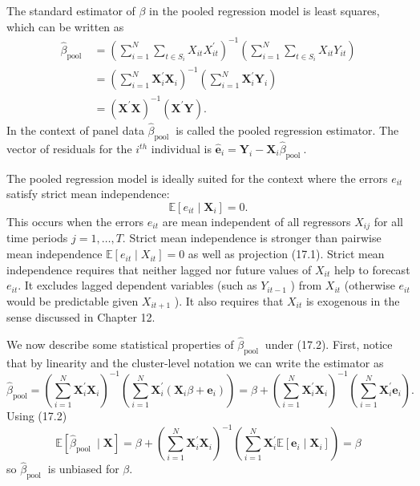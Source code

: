 \documentclass[10pt]{article}
\begin{document}
The standard estimator of $\beta$ in the pooled regression model is least squares, which can be written as
$$
\begin{aligned}
\widehat{\beta}_{\text {pool }} &=\left(\sum_{i=1}^{N} \sum_{t \in S_{i}} X_{i t} X_{i t}^{\prime}\right)^{-1}\left(\sum_{i=1}^{N} \sum_{t \in S_{i}} X_{i t} Y_{i t}\right) \\
&=\left(\sum_{i=1}^{N} \boldsymbol{X}_{i}^{\prime} \boldsymbol{X}_{i}\right)^{-1}\left(\sum_{i=1}^{N} \boldsymbol{X}_{i}^{\prime} \boldsymbol{Y}_{i}\right) \\
&=\left(\boldsymbol{X}^{\prime} \boldsymbol{X}\right)^{-1}\left(\boldsymbol{X}^{\prime} \boldsymbol{Y}\right) .
\end{aligned}
$$
In the context of panel data $\widehat{\beta}_{\text {pool }}$ is called the pooled regression estimator. The vector of residuals for the $i^{t h}$ individual is $\widehat{\boldsymbol{e}}_{i}=\boldsymbol{Y}_{i}-\boldsymbol{X}_{i} \widehat{\beta}_{\text {pool }}$.

The pooled regression model is ideally suited for the context where the errors $e_{i t}$ satisfy strict mean independence:
$$
\mathbb{E}\left[e_{i t} \mid \boldsymbol{X}_{i}\right]=0 .
$$
This occurs when the errors $e_{i t}$ are mean independent of all regressors $X_{i j}$ for all time periods $j=1, \ldots, T$. Strict mean independence is stronger than pairwise mean independence $\mathbb{E}\left[e_{i t} \mid X_{i t}\right]=0$ as well as projection (17.1). Strict mean independence requires that neither lagged nor future values of $X_{i t}$ help to forecast $e_{i t}$. It excludes lagged dependent variables (such as $Y_{i t-1}$ ) from $X_{i t}$ (otherwise $e_{i t}$ would be predictable given $X_{i t+1}$ ). It also requires that $X_{i t}$ is exogenous in the sense discussed in Chapter 12.

We now describe some statistical properties of $\widehat{\beta}_{\text {pool }}$ under (17.2). First, notice that by linearity and the cluster-level notation we can write the estimator as
$$
\widehat{\beta}_{\mathrm{pool}}=\left(\sum_{i=1}^{N} \boldsymbol{X}_{i}^{\prime} \boldsymbol{X}_{i}\right)^{-1}\left(\sum_{i=1}^{N} \boldsymbol{X}_{i}^{\prime}\left(\boldsymbol{X}_{i} \beta+\boldsymbol{e}_{i}\right)\right)=\beta+\left(\sum_{i=1}^{N} \boldsymbol{X}_{i}^{\prime} \boldsymbol{X}_{i}\right)^{-1}\left(\sum_{i=1}^{N} \boldsymbol{X}_{i}^{\prime} \boldsymbol{e}_{i}\right) .
$$
Using (17.2)
$$
\mathbb{E}\left[\widehat{\beta}_{\text {pool }} \mid \boldsymbol{X}\right]=\beta+\left(\sum_{i=1}^{N} \boldsymbol{X}_{i}^{\prime} \boldsymbol{X}_{i}\right)^{-1}\left(\sum_{i=1}^{N} \boldsymbol{X}_{i}^{\prime} \mathbb{E}\left[\boldsymbol{e}_{i} \mid \boldsymbol{X}_{i}\right]\right)=\beta
$$
so $\widehat{\beta}_{\text {pool }}$ is unbiased for $\beta$.
\end{document}
